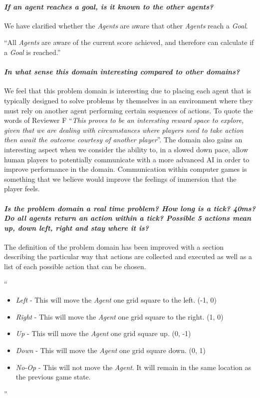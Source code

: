 \documentclass{article}
\begin{document}
\paragraph*{\textit{If an agent reaches a goal, is it known to the other agents?}}
We have clarified whether the \emph{Agents} are aware that other \emph{Agents} reach a \emph{Goal}.

``All \emph{Agents} are aware of the current score achieved, and therefore can calculate if a \emph{Goal} is reached.''

\paragraph*{\textit{In what sense this domain interesting compared to other domains?}}
We feel that this problem domain is interesting due to placing each agent that is typically designed to solve problems by themselves in an environment where they must rely on another agent performing certain sequences of actions. To quote the words of Reviewer F ``\textit{This proves to be an interesting reward space to explore, given that we are dealing with circumstances where players need to take action then await the outcome courtesy of another player}''. The domain also gains an interesting aspect when we consider the ability to, in a slowed down pace, allow human players to potentially communicate with a more advanced AI in order to improve performance in the domain. Communication within computer games is something that we believe would improve the feelings of immersion that the player feels.


\paragraph*{\textit{Is the problem domain a real time problem? How long is a tick? 40ms? Do all agents return an action within a tick? Possible 5 actions mean up, down left, right and stay where it is?}}
The definition of the problem domain has been improved with a section describing the particular way that actions are collected and executed as well as a list of each possible action that can be chosen.

``\begin{itemize}
\item{\emph{Left} - This will move the \emph{Agent} one grid square to the left. (-1, 0)}
\item{\emph{Right} - This will move the \emph{Agent} one grid square to the right. (1, 0)}
\item{\emph{Up} - This will move the \emph{Agent} one grid square up. (0, -1)}
\item{\emph{Down} - This will move the \emph{Agent} one grid square down. (0, 1)}
\item{\emph{No-Op} - This will not move the \emph{Agent}. It will remain in the same location as the previous game state.}
\end{itemize}''
\end{document}

